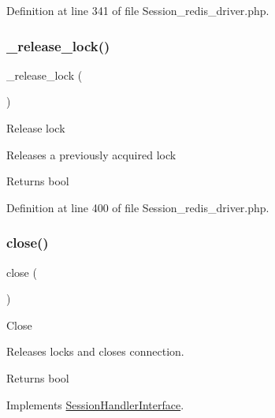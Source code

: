 Definition at line 341 of file Session\+\_\+redis\+\_\+driver.\+php.

\mbox{\label{class_c_i___session__redis__driver_a0265e356e6cf1eaba229663c1664c37d}} 
\subsubsection{\texorpdfstring{\_release\_lock()}{\_release\_lock()}}
{\footnotesize\ttfamily \+\_\+release\+\_\+lock (\begin{DoxyParamCaption}{ }\end{DoxyParamCaption})\hspace{0.3cm}{\ttfamily [protected]}}

Release lock

Releases a previously acquired lock

\begin{DoxyReturn}{Returns}
bool 
\end{DoxyReturn}


Definition at line 400 of file Session\+\_\+redis\+\_\+driver.\+php.

\mbox{\label{class_c_i___session__redis__driver_aa69c8bf1f1dcf4e72552efff1fe3e87e}} 
\subsubsection{\texorpdfstring{close()}{close()}}
{\footnotesize\ttfamily close (\begin{DoxyParamCaption}{ }\end{DoxyParamCaption})}

Close

Releases locks and closes connection.

\begin{DoxyReturn}{Returns}
bool 
\end{DoxyReturn}


Implements \mbox{\hyperlink{interface_session_handler_interface_aa69c8bf1f1dcf4e72552efff1fe3e87e}{Session\+Handler\+Interface}}.



